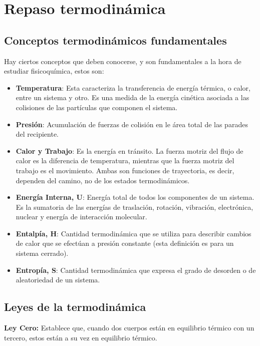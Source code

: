 \section{Repaso termodinámica}
\subsection{Conceptos termodinámicos fundamentales}
Hay ciertos conceptos que deben conocerse, y son fundamentales a la hora de estudiar fisicoquímica, estos son:
\begin{itemize}
    \item \textbf{Temperatura}: Esta caracteriza la transferencia de energía térmica, o calor, entre un sistema y otro. Es una medida de la energía cinética asociada a las colisiones de las partículas que componen el sistema.
    \item \textbf{Presión}: Acumulación de fuerzas de colisión en le área total de las parades del recipiente.
    \item \textbf{Calor y Trabajo}: Es la energía en tránsito. La fuerza motriz del flujo de calor es la diferencia de temperatura, mientras que la fuerza motriz del trabajo es el movimiento. Ambas son funciones de trayectoria, es decir, dependen del camino, no de los estados termodinámicos.
    \item \textbf{Energía Interna, U}: Energía total de todos los componentes de un sistema. Es la sumatoria de las energías de traslación, rotación, vibración, electrónica, nuclear y energía de interacción molecular.
    \item \textbf{Entalpía, H}: Cantidad termodinámica que se utiliza para describir cambios de calor que se efectúan a presión constante (esta definición es para un sistema cerrado).
    \item \textbf{Entropía, S}: Cantidad termodinámica que expresa el grado de desorden o de aleatoriedad de un sistema.
\end{itemize}

\subsection{Leyes de la termodinámica}

\textbf{Ley Cero:} Establece que, cuando dos cuerpos están en equilibrio térmico con un tercero, estos están a su vez en equilibrio térmico.


